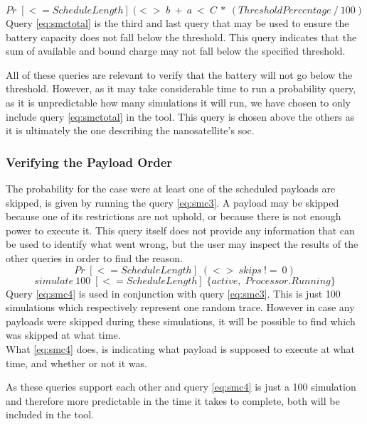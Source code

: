 \begin{equation} \label{eq:smctotal}
	Pr\; [<=ScheduleLength] \; (<>\; b\ +\ a\ <\ C\ *\ (ThresholdPercentage\ /\ 100)
\end{equation}
Query \ref{eq:smctotal} is the third and last query that may be used to ensure the battery capacity does not fall below the threshold.
This query indicates that the sum of available and bound charge may not fall below the specified threshold.

All of these queries are relevant to verify that the battery will not go below the threshold.
However, as it may take considerable time to run a probability query, as it is unpredictable how many simulations it will run, we have chosen to only include query \ref{eq:smctotal} in the tool.
This query is chosen above the others as it is ultimately the one describing the nanosatellite's \gls{soc}.

\subsubsection*{Verifying the Payload Order}
The probability for the case were at least one of the scheduled payloads are skipped, is given by running the query \ref{eq:smc3}.
A payload may be skipped because one of its restrictions are not uphold, or because there is not enough power to execute it.
This query itself does not provide any information that can be used to identify what went wrong, but the user may inspect the results of the other queries in order to find the reason.
\begin{equation} \label{eq:smc3}
Pr\; [<=ScheduleLength] \; (<> \ skips \ !=\ 0)
\end{equation}
\begin{equation} \label{eq:smc4}
	simulate\ 100 \; [<=ScheduleLength] \; \{active, \; Processor.Running\}
\end{equation}
Query \ref{eq:smc4} is used in conjunction with query \ref{eq:smc3}.
This is just 100 simulations which respectively represent one random trace.
However in case any payloads were skipped during these simulations, it will be possible to find which was skipped at what time.\\
What \ref{eq:smc4} does, is indicating what payload is supposed to execute at what time, and whether or not it was.

As these queries support each other and query \ref{eq:smc4} is just a 100 simulation and therefore more predictable in the time it takes to complete, both will be included in the tool.

